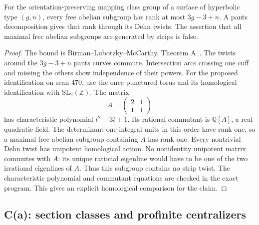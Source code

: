 \begin{proposition}
\label{C-abelian}
For the orientation-preserving mapping class group of a
surface of hyperbolic type $(g,n)$, every free abelian
subgroup has rank at most $3g-3+n$. A pants decomposition
gives that rank through its Dehn twists.
The assertion that all maximal free abelian subgroups
are generated by strips is false.
\end{proposition}
\begin{proof}
The bound is Birman--Lubotzky--McCarthy, Theorem A~\cite{BLM1983}.
The twists around the $3g-3+n$ pants curves commute.
Intersection arcs crossing one cuff and missing the others
show independence of their powers.
For the proposed identification on scan 470, use the
once-punctured torus and its homological identification
with $\mathrm{SL}_2(\mathbb Z)$. The matrix
\[
 A=\begin{pmatrix}2&1\\1&1\end{pmatrix}
\]
has characteristic polynomial $t^2-3t+1$. Its rational
commutant is $\mathbb Q[A]$, a real quadratic field.
The determinant-one integral units in this order have
rank one, so a maximal free abelian subgroup containing
$A$ has rank one. Every nontrivial Dehn twist has
unipotent homological action. No nonidentity unipotent
matrix commutes with $A$: its unique rational eigenline
would have to be one of the two irrational eigenlines
of $A$. Thus this subgroup contains no strip twist.
The characteristic polynomial and commutant equations
are checked in the exact program. This gives an
explicit homological comparison for the claim.
\end{proof}

\subsection{C(a): section classes and profinite centralizers}

